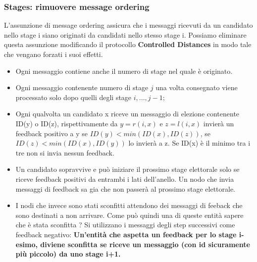 \documentclass[12pt]{article}
\begin{document}
		\subsubsection{Stages: rimuovere message ordering}
			L'assunzione di message ordering assicura che i messaggi ricevuti da un candidato nello stage i siano originati da candidati nello stesso stage i. Possiamo eliminare questa assunzione modificando il protocollo \textbf{Controlled Distances} in modo tale che vengano forzati i suoi effetti.
			\begin{itemize}
				\item Ogni messaggio contiene anche il numero di stage nel quale è originato.
				\item Ogni messaggio contenente numero di stage $j$ una volta consegnato viene processato solo dopo quelli degli stage $i,...,j-1$;
				\item Ogni qualvolta un candidato x riceve un messaggio di elezione contenente ID(y) o ID(z), rispettivamente da $y=r(i,x)$ e $z=l(i,x)$ invierà un feedback positivo a y se $ID(y) < min(ID(x),ID(z))$, se $ID(z) < min(ID(x),ID(y))$ lo invierà a z. Se ID(x) è il minimo tra i tre non si invia nessun feedback.
				\item Un candidato sopravvive e può iniziare il prossimo stage elettorale solo se riceve feedback positivi da entrambi i lati dell'anello. Un nodo che invia messaggi di feedback sa gia che non passerà al prossimo stage elettorale.
				\item I nodi che invece sono stati sconfitti attendono dei messaggi di feeback che sono destinati a non arrivare. Come può quindi una di queste entità sapere che è stata sconfitta ? Si utilizzano i messaggi degli step successivi come feedback negativo: \textbf{Un'entità che aspetta un feedback per lo stage i-esimo, diviene sconfitta se riceve un messaggio (con id sicuramente più piccolo) da uno stage i+1.}
			\end{itemize}
		
\end{document}
